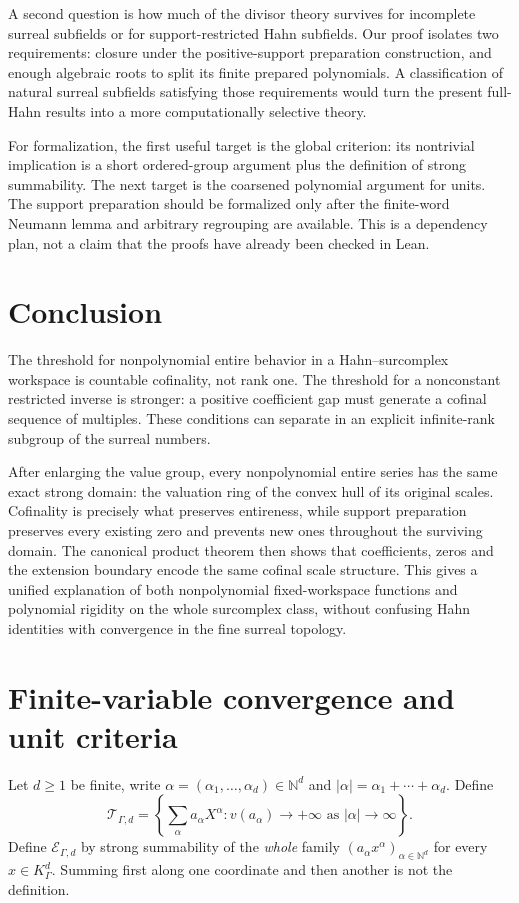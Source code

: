 \documentclass[11pt,letterpaper]{article}
\numberwithin{equation}{section}
\theoremstyle{definition}
\theoremstyle{remark}
\newcommand{\N}{\mathbb N}
\begin{document}
A second question is how much of the divisor theory survives for incomplete
surreal subfields or for support-restricted Hahn subfields. Our proof isolates
two requirements: closure under the positive-support preparation construction,
and enough algebraic roots to split its finite prepared polynomials. A
classification of natural surreal subfields satisfying those requirements
would turn the present full-Hahn results into a more computationally selective
theory.

For formalization, the first useful target is the global criterion: its
nontrivial implication is a short ordered-group argument plus the definition
of strong summability. The next target is the coarsened polynomial argument
for units. The support preparation should be formalized only after the
finite-word Neumann lemma and arbitrary regrouping are available. This is a
dependency plan, not a claim that the proofs have already been checked in Lean.

\section{Conclusion}
The threshold for nonpolynomial entire behavior in a Hahn--surcomplex
workspace is countable cofinality, not rank one. The threshold for a nonconstant
restricted inverse is stronger: a positive coefficient gap must generate a
cofinal sequence of multiples. These conditions can separate in an explicit
infinite-rank subgroup of the surreal numbers.

After enlarging the value group, every nonpolynomial entire series has the
same exact strong domain: the valuation ring of the convex hull of its
original scales. Cofinality is precisely what preserves entireness, while
support preparation preserves every existing zero and prevents new ones
throughout the surviving domain. The canonical product theorem then shows
that coefficients, zeros and the extension boundary encode the same cofinal
scale structure. This gives a unified explanation of both nonpolynomial
fixed-workspace functions and polynomial rigidity on the whole surcomplex
class, without confusing Hahn identities with convergence in the fine
surreal topology.

\appendix
\section{Finite-variable convergence and unit criteria}\label{app:multivariate}
Let $d\ge1$ be finite, write
$\alpha=(\alpha_1,\ldots,\alpha_d)\in\N^d$ and
$|\alpha|=\alpha_1+\cdots+\alpha_d$. Define
\[
 \mathcal T_{\Gamma,d}
 =\left\{\sum_\alpha a_\alpha X^\alpha:
              v(a_\alpha)\to+\infty\text{ as }|\alpha|\to\infty\right\}.
\]
Define $\mathcal E_{\Gamma,d}$ by strong summability of the \emph{whole}
family $(a_\alpha x^\alpha)_{\alpha\in\N^d}$ for every
$x\in K_\Gamma^d$. Summing first along one coordinate and then another is
not the definition.
\end{document}
